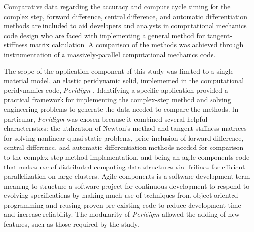 \documentclass[preprint,12pt]{elsarticle}
\begin{document}
Comparative data regarding the accuracy and compute cycle timing for the complex step, forward difference, central difference, and automatic differentiation methods are included to aid developers and analysts in computational mechanics code design who are faced with implementing a general method for tangent-stiffness matrix calculation.  A comparison of the methods was achieved through instrumentation of a massively-parallel computational mechanics code. 

The scope of the application component of this study was limited to a single material model, an elastic peridynamic solid, implemented in the computational peridynamics code, \textit{Peridigm} \cite{peridigm}. Identifying a specific application provided a practical framework for implementing the   complex-step method and solving engineering problems to generate the data needed to compare the methods. In particular, \emph{Peridigm} was chosen because it combined several helpful characteristics: the utilization of Newton's method and tangent-stiffness matrices for solving nonlinear quasi-static problems, prior inclusion of forward difference, central difference, and automatic-differentiation methods needed for comparison to the complex-step method implementation, and being an agile-components code that makes use of distributed computing data structures via Trilinos \cite{trilinos} for efficient parallelization on large clusters. Agile-components is a software development term meaning to structure a software project for continuous development to respond to evolving specifications by making much use of techniques from object-oriented programming and reusing proven pre-existing code to reduce development time and increase reliability. The modularity of \emph{Peridigm} allowed the adding of new features, such as those required by the study.
\end{document}
